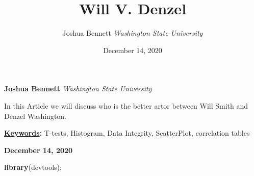 \documentclass[]{article}
\title{\textbf{\textcolor{WSU.crimson}{Will V. Denzel}}  }
\author{\Large Joshua
Bennett\vspace{0.05in} \newline\normalsize\emph{Washington State
University}  }
\date{December 14, 2020}
\newcommand*{\authorfont}{\fontfamily{phv}\selectfont}
\renewenvironment{abstract}
 {{%
    \setlength{\leftmargin}{0mm}
    \setlength{\rightmargin}{\leftmargin}%
  }%
  \relax}
 {\endlist}
\newenvironment{Shaded}{\begin{snugshade}}{\end{snugshade}}
\newcommand{\KeywordTok}[1]{\textcolor[rgb]{0.13,0.29,0.53}{\textbf{#1}}}
\newcommand{\NormalTok}[1]{#1}
\begin{document}
	
%    


{%
\setlength{\parindent}{0pt}
\thispagestyle{plain}
{\fontsize{18}{20}\selectfont\raggedright 
\maketitle  %

}

{
   \vskip 13.5pt\relax \normalsize\fontsize{11}{12} 
   
\textbf{\authorfont Joshua Bennett} \hskip 15pt \emph{\small Washington
State University}   

}

}








\begin{abstract}

    \hbox{\vrule height .2pt width 39.14pc}

    \vskip 8.5pt %

\noindent In this Article we will discuss who is the better artor
between Will Smith and Denzel Washington.


\vskip 8.5pt \noindent \textbf{\underline{Keywords}:} T-tests,
Histogram, Data Integrity, ScatterPlot, correlation tables \par

    




    
    \hbox{\vrule height .2pt width 39.14pc}
    \vskip 5pt 
    \hfill \textbf{\textcolor{WSU.gray}{ December 14, 2020 } }
    \vskip 5pt 
    
\end{abstract}


\vskip -8.5pt




\noindent  

\begin{Shaded}
\begin{Highlighting}[]
\KeywordTok{library}\NormalTok{(devtools);}
\end{Highlighting}
\end{Shaded}
\end{document}
